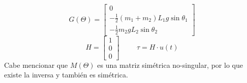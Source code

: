 \begin{equation}
 G\left( \Theta \right) = \begin{bmatrix}
0 \\
 - \frac{1}{2}(m_1+m_2)L_1g\sin\theta_1 \\
- \frac{1}{2}m_2gL_2\sin\theta_2
\end{bmatrix}
\end{equation}
\begin{equation}
 H = \begin{bmatrix}
1 \\
 0 \\
0
\end{bmatrix}
\hspace{1cm}
\tau = H\cdot u(t)
\end{equation}
Cabe mencionar que $M(\Theta)$ es una matriz simétrica no-singular, por lo que existe la inversa y también es simétrica.

%
